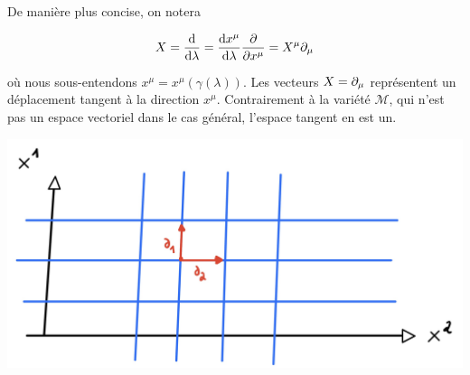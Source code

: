 De manière plus concise, on notera

\begin{equation*}
    X = \frac{\mathrm{d}}{\mathrm{d} \lambda }= \frac{\mathrm{d} x^{\mu}}{\mathrm{d} \lambda } \frac{\partial }{\partial x^{\mu}} = X^{\mu} \partial_{\mu}
\end{equation*}

où nous sous-entendons $x^{\mu} = x^{\mu}( \gamma(\lambda))$. Les vecteurs $X = \partial_\mu$ représentent un déplacement tangent à la direction $x^\mu$. Contrairement à la variété $\mathcal{M}$, qui n'est pas un espace vectoriel dans le cas général, l'espace tangent en est un. 
\begin{center}
\includegraphics[scale=0.1]{Chapitres/3.Element de géométrie différentielle/Images/vecteur-fleche.jpg}
\end{center}
